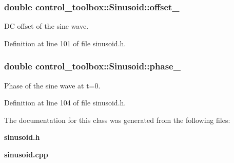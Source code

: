 \subsubsection[{offset\-\_\-}]{\setlength{\rightskip}{0pt plus 5cm}double {\bf control\-\_\-toolbox\-::\-Sinusoid\-::offset\-\_\-}\hspace{0.3cm}{\ttfamily  [private]}}\label{classcontrol__toolbox_1_1Sinusoid_a328d0ffb59a6754c23c07f65c6de7c0b}
\-D\-C offset of the sine wave. 

\-Definition at line 101 of file sinusoid.\-h.

\subsubsection[{phase\-\_\-}]{\setlength{\rightskip}{0pt plus 5cm}double {\bf control\-\_\-toolbox\-::\-Sinusoid\-::phase\-\_\-}\hspace{0.3cm}{\ttfamily  [private]}}\label{classcontrol__toolbox_1_1Sinusoid_a96223662b81c22fe707e571e0c9fd94b}
\-Phase of the sine wave at t=0. 

\-Definition at line 104 of file sinusoid.\-h.



\-The documentation for this class was generated from the following files\-:\begin{DoxyCompactItemize}
\item 
{\bf sinusoid.\-h}\item 
{\bf sinusoid.\-cpp}\end{DoxyCompactItemize}
